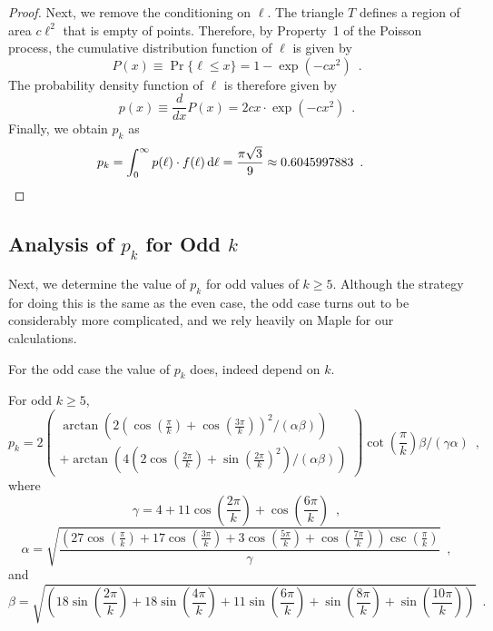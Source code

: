 \documentclass{patmorin}
\begin{document}
\begin{proof}
  Next, we remove the conditioning on $\ell$.  The triangle $T$ defines a
  region of area $c\ell^2$ that is empty of points.  Therefore,
  by Property~1 of the Poisson process, the cumulative distribution
  function of $\ell$ is given by
  \[
    P(x) \equiv \Pr\{\ell \le x\} = 1-\exp(-cx^2) \enspace .
  \]
  The probability density function of $\ell$ is therefore given by 
  \[
     p(x) \equiv \frac{d}{dx}P(x) =
     2cx\cdot\exp(-cx^2) \enspace .
  \]
  Finally, we obtain $p_k$ as 
  \begin{align*}
     p_k = \int_0^\infty p(\ell)\cdot f(\ell)\,\mathrm{d}\ell 
     = \frac{\pi\sqrt{3}}{9}
      \approx 0.6045997883  \enspace . & \qedhere
  \end{align*}
\end{proof}


\subsection{Analysis of $p_k$ for Odd $k$}

Next, we determine the value of $p_k$ for odd values of
$k\ge 5$.  Although the strategy for doing this is the same as the even
case, the odd case turns out to be considerably more complicated, and
we rely heavily on Maple for our calculations.

For the odd case the value of $p_k$ does, indeed depend on $k$.

\begin{lem}
  For odd $k\ge 5$,
\[
p_k = 
2
\left(\begin{array}{l}
  \arctan\left(
     2\left(\cos\left(\frac{\pi }{k}\right)
       +\cos\left(\frac{3 \pi }{k}\right)\right)^2 / (\alpha\beta) 
  \right) \\
   + \arctan\left(
       4 \left(2 \cos\left(\frac{2 \pi }{k}\right)
       +\sin\left(\frac{2 \pi }{k}\right)^2\right)/(\alpha\beta) 
     \right)
  \end{array}
\right)
\cot\left(\frac{\pi }{k}\right) 
\beta
/
\left(\gamma \alpha\right)\enspace ,
\]
where
\[
\gamma =4+11 \cos\left(\frac{2 \pi }{k}\right)+\cos\left(\frac{6 \pi }{k}\right) \enspace ,
\]
\[
\alpha = 
\sqrt{\frac{\left(27 \cos\left(\frac{\pi }{k}\right)+17 \cos\left(\frac{3 \pi }{k}\right)+3 \cos\left(\frac{5 \pi }{k}\right)+\cos\left(\frac{7 \pi }{k}\right)\right) \csc\left(\frac{\pi }{k}\right)}{\gamma}} \enspace ,
\]
and
\[
\beta = \sqrt{\left(18 \sin\left(\frac{2 \pi }{k}\right)+18 \sin\left(\frac{4 \pi }{k}\right)+11 \sin\left(\frac{6 \pi }{k}\right)+\sin\left(\frac{8 \pi }{k}\right)+\sin\left(\frac{10 \pi }{k}\right)\right)} \enspace .
\]
\end{lem}
\end{document}

